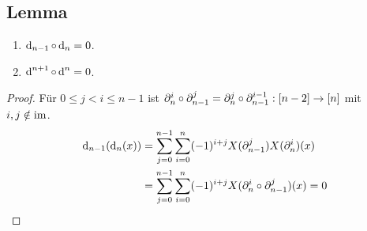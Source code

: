 \subsection{Lemma}
\begin{lemma}
  \begin{enumerate}[label=(\alph*)]
    \item $\operatorname{d}_{n-1}\circ \operatorname{d}_n= 0$.
    \item $\operatorname{d}^{n+1}\circ \operatorname{d}^n=0$.
  \end{enumerate}
\end{lemma}
\begin{proof}
  Für $0\leq j< i\leq n-1$ ist
  $\partial_n^i\circ \partial_{n-1}^j = \partial_n^j\circ\partial_{n-1}^{i-1}:
  [n-2]\to[n]$ mit $i,j\notin \operatorname{im}$.
  \begin{align*}
    \operatorname{d}_{n-1}(\operatorname{d}_n(x)) &= \sum_{j=0}^{n-1}\sum_{i=0}^n (-1)^{i+j}
     X(\partial_{n-1}^j)X(\partial_n^i)(x) \\
    &= \sum_{j=0}^{n-1}\sum_{i=0}^n (-1)^{i+j} X(\partial_n^i\circ
    \partial_{n-1}^j)(x) = 0
  \end{align*}
\end{proof}
